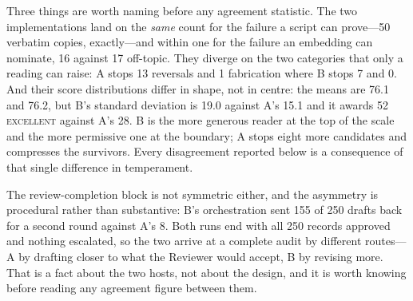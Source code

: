 \documentclass[conference]{IEEEtran}
\begin{document}
Three things are worth naming before any agreement statistic. The two
implementations land on the \emph{same} count for the failure a script
can prove---50 verbatim copies, exactly---and within one for the failure
an embedding can nominate, 16 against 17 off-topic. They diverge on the
two categories that only a reading can raise: A stops 13 reversals and
1 fabrication where B stops 7 and 0. And their score distributions
differ in shape, not in centre: the means are 76.1 and 76.2, but B's
standard deviation is 19.0 against A's 15.1 and it awards 52
\textsc{excellent} against A's 28. B is the more generous reader at the
top of the scale and the more permissive one at the boundary; A stops
eight more candidates and compresses the survivors. Every disagreement
reported below is a consequence of that single difference in
temperament.

The review-completion block is not symmetric either, and the asymmetry
is procedural rather than substantive: B's orchestration sent 155 of 250
drafts back for a second round against A's 8. Both runs end with all 250
records approved and nothing escalated, so the two arrive at a complete
audit by different routes---A by drafting closer to what the Reviewer
would accept, B by revising more. That is a fact about the two hosts,
not about the design, and it is worth knowing before reading any
agreement figure between them.
\end{document}
